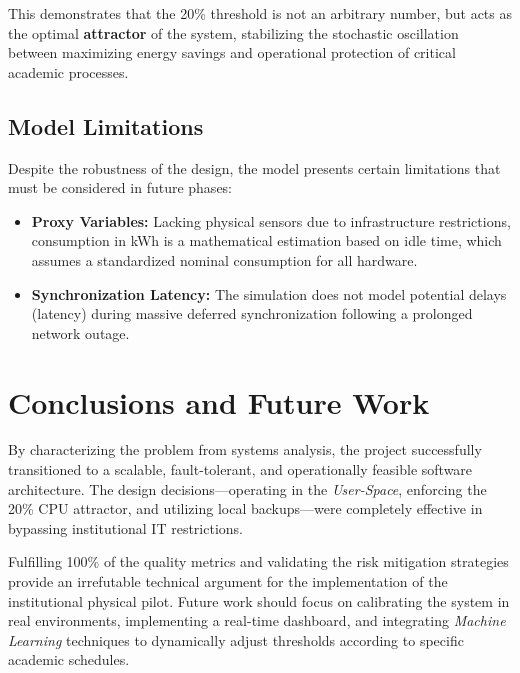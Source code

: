 \documentclass[12pt,a4paper]{article}
\begin{document}
This demonstrates that the 20\% threshold is not an arbitrary number, but acts as the optimal \textbf{attractor} of the system, stabilizing the stochastic oscillation between maximizing energy savings and operational protection of critical academic processes.

\subsection{Model Limitations}
Despite the robustness of the design, the model presents certain limitations that must be considered in future phases:
\begin{itemize}
    \item \textbf{Proxy Variables:} Lacking physical sensors due to infrastructure restrictions, consumption in kWh is a mathematical estimation based on idle time, which assumes a standardized nominal consumption for all hardware.
    \item \textbf{Synchronization Latency:} The simulation does not model potential delays (latency) during massive deferred synchronization following a prolonged network outage.
\end{itemize}

\section{Conclusions and Future Work}
By characterizing the problem from systems analysis, the project successfully transitioned to a scalable, fault-tolerant, and operationally feasible software architecture. The design decisions—operating in the \textit{User-Space}, enforcing the 20\% CPU attractor, and utilizing local backups—were completely effective in bypassing institutional IT restrictions.

Fulfilling 100\% of the quality metrics and validating the risk mitigation strategies provide an irrefutable technical argument for the implementation of the institutional physical pilot. Future work should focus on calibrating the system in real environments, implementing a real-time dashboard, and integrating \textit{Machine Learning} techniques to dynamically adjust thresholds according to specific academic schedules.
\end{document}
